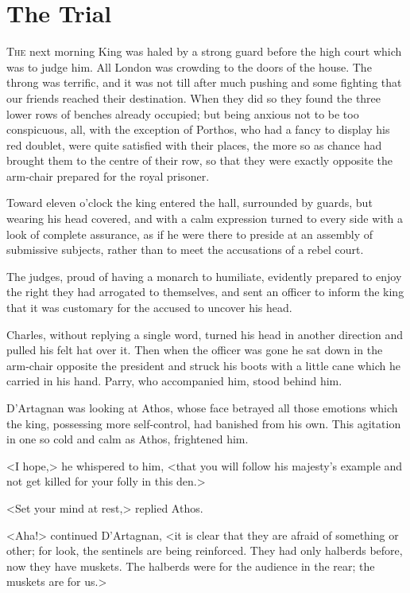 \chapter{The Trial}

 \lettrine{T}{he} next morning King   was haled by a strong guard before the high court which was to judge him. All London was crowding to the doors of the house. The throng was terrific, and it was not till after much pushing and some fighting that our friends reached their destination. When they did so they found the three lower rows of benches already occupied; but being anxious not to be too conspicuous, all, with the exception of Porthos, who had a fancy to display his red doublet, were quite satisfied with their places, the more so as chance had brought them to the centre of their row, so that they were exactly opposite the arm-chair prepared for the royal prisoner.

Toward eleven o'clock the king entered the hall, surrounded by guards, but wearing his head covered, and with a calm expression turned to every side with a look of complete assurance, as if he were there to preside at an assembly of submissive subjects, rather than to meet the accusations of a rebel court.

The judges, proud of having a monarch to humiliate, evidently prepared to enjoy the right they had arrogated to themselves, and sent an officer to inform the king that it was customary for the accused to uncover his head.

Charles, without replying a single word, turned his head in another direction and pulled his felt hat over it. Then when the officer was gone he sat down in the arm-chair opposite the president and struck his boots with a little cane which he carried in his hand. Parry, who accompanied him, stood behind him.

D'Artagnan was looking at Athos, whose face betrayed all those emotions which the king, possessing more self-control, had banished from his own. This agitation in one so cold and calm as Athos, frightened him.

<I hope,> he whispered to him, <that you will follow his majesty's example and not get killed for your folly in this den.>

<Set your mind at rest,> replied Athos.

<Aha!> continued D'Artagnan, <it is clear that they are afraid of something or other; for look, the sentinels are being reinforced. They had only halberds before, now they have muskets. The halberds were for the audience in the rear; the muskets are for us.>

